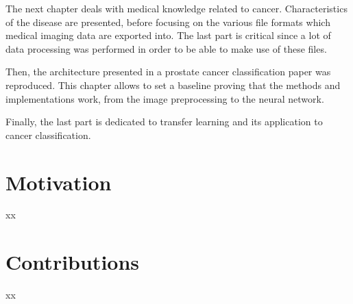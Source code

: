 The next chapter deals with medical knowledge related to cancer. Characteristics of the disease are presented, before focusing on the various file formats which medical imaging data are exported into. The last part is critical since a lot of data processing was performed in order to be able to make use of these files.

Then, the architecture presented in a prostate cancer classification paper was reproduced. This chapter allows to set a baseline proving that the methods and implementations work, from the image preprocessing to the neural network.

Finally, the last part is dedicated to transfer learning and its application to cancer classification.



\section{Motivation}
xx


\section{Contributions}
xx